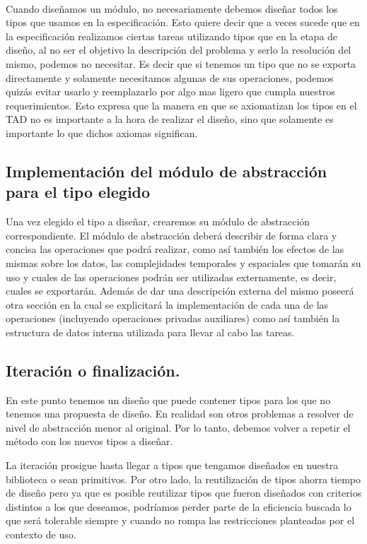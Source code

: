 ~

Cuando dise\~namos un m\'odulo, no necesariamente debemos dise\~nar todos los tipos que usamos en la especificaci\'on. Esto quiere decir que a veces sucede que en la especificaci\'on realizamos ciertas tareas utilizando tipos que en la etapa de dise\~no, al no ser el objetivo la descripci\'on del problema y serlo la resoluci\'on del mismo, podemos no necesitar. Es decir que si tenemos un tipo que no se exporta directamente y solamente necesitamos algunas de sus operaciones, podemos quiz\'as evitar usarlo y reemplazarlo por algo mas ligero que cumpla nuestros requerimientos. Esto expresa que la manera en que se axiomatizan los tipos en el TAD no es importante a la hora de realizar el dise\~no, sino que solamente es importante lo que dichos axiomas significan.

\subsection{Implementaci\'on del m\'odulo de abstracci\'on para el tipo elegido}

Una vez elegido el tipo a dise\~nar, crearemos su m\'odulo de abstracci\'on correspondiente. El m\'odulo de abstracci\'on deber\'a describir de forma clara y concisa las operaciones que podr\'a realizar, como as\'i tambi\'en los efectos de las mismas sobre los datos, las complejidades temporales y espaciales que tomar\'an su uso y cuales de las operaciones podr\'an ser utilizadas externamente, es decir, cuales se exportar\'an. Adem\'as de dar una descripci\'on externa del mismo poseer\'a otra secci\'on en la cual se explicitar\'a la implementaci\'on de cada una de las operaciones (incluyendo operaciones privadas auxiliares) como as\'i tambi\'en la estructura de datos interna utilizada para llevar al cabo las tareas.

\subsection{Iteraci\'on o finalizaci\'on.}
En este punto tenemos un dise\~no que puede contener tipos para los que no tenemos una propuesta de dise\~no. En realidad son otros problemas a resolver de nivel de abstracci\'on menor al original. Por lo tanto, debemos volver a repetir el m\'etodo con los nuevos tipos a dise\~nar.

La iteraci\'on prosigue hasta llegar a tipos que tengamos dise\~nados en nuestra biblioteca o sean primitivos. Por otro lado, la reutilizaci\'on de tipos ahorra tiempo de dise\~no pero ya que es posible reutilizar tipos que fueron dise\~nados con criterios distintos a los que deseamos, podr\'iamos perder parte de la eficiencia buscada lo que ser\'a tolerable siempre y cuando no rompa las restricciones planteadas por el contexto de uso.

